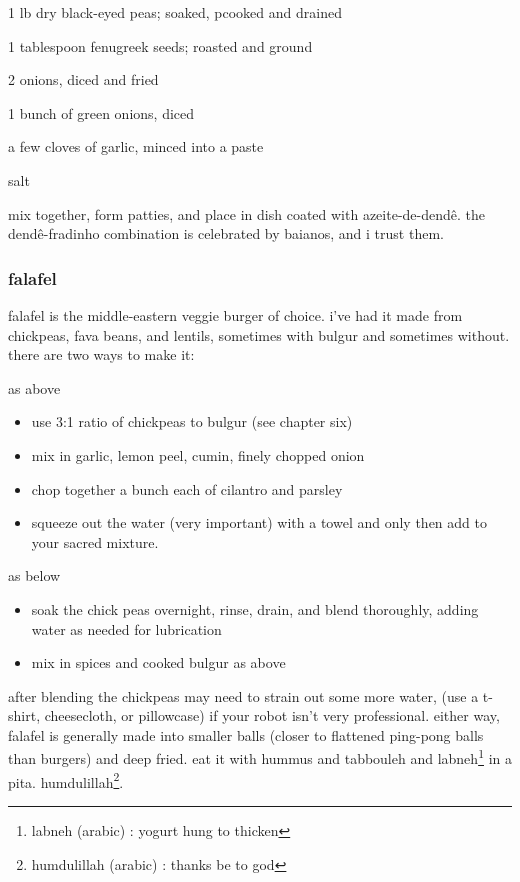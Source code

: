 \begin{ingredients}
  \item 1 lb dry black-eyed peas; soaked, pcooked and drained
  \item 1 tablespoon fenugreek seeds; roasted and ground
  \item 2 onions, diced and fried
  \item 1 bunch of green onions, diced
  \item a few cloves of garlic, minced into a paste
  \item salt
\end{ingredients}

mix together, form patties, and place in dish coated with azeite-de-dend\^{e}. 
the dend\^{e}-fradinho combination is celebrated by baianos, and i trust them.

\subsubsection{falafel}

falafel is the middle-eastern veggie burger of choice. i've had it made from 
chickpeas, fava beans, and lentils, sometimes with bulgur and sometimes 
without. there are two ways to make it:

\begin{algorithm}
  \item as above
  \begin{itemize}
    \item use 3:1 ratio of chickpeas to bulgur (see chapter six)
    \item mix in garlic, lemon peel, cumin, finely chopped onion
    \item chop together a bunch each of cilantro and parsley
    \item squeeze out the water (very important) with a towel and only then add to your sacred mixture.
  \end{itemize}
  	
  \item as below
  \begin{itemize}
    \item soak the chick peas overnight, rinse, drain, and blend thoroughly, adding water as needed for lubrication
    \item mix in spices and cooked bulgur as above
  \end{itemize}

\end{algorithm}

after blending the chickpeas may need to strain out some more water, (use a 
t-shirt, cheesecloth, or pillowcase) if your robot isn't very professional. 
either way, falafel is generally made into smaller balls (closer to flattened 
ping-pong balls than burgers) and deep fried. eat it with hummus and tabbouleh 
and labneh\footnote{labneh (arabic) : yogurt hung to thicken} in a pita. 
humdulillah\footnote{humdulillah (arabic) : thanks be to god}.


